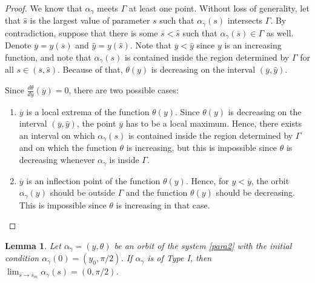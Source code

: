 \documentclass[12pt]{amsart}
\theoremstyle{plain}
\newtheorem{lemma}[theorem]{Lemma}
\theoremstyle{definition}
\begin{document}
\begin{proof}
    We know that $\alpha_\gamma$ meets $\Gamma$  at least one point. Without loss of generality, let   that $\hat{s}$ is the largest value of parameter $s$ such that $\alpha_\gamma(s)$ intersects $\Gamma$. By contradiction, suppose that there is some $\overline{s} < \hat{s}$ such that $\alpha_\gamma(\overline{s}) \in \Gamma$ as well. Denote $\overline{y} = y(\overline{s})$ and $\hat{y} = y(\hat{s})$. Note that $\overline{y} < \hat{y}$ since $y$ is an increasing function, and note that $\alpha_\gamma(s)$ is contained inside the region determined by $\Gamma$ for all $s \in (\overline{s}, \hat{s})$. Because of that, $\theta(y)$ is decreasing on the interval $(\overline{y}, \hat{y})$.

    Since $\frac{d\theta}{dy}(\overline{y}) = 0$, there are two possible cases:

    \begin{enumerate}
	\item  $\overline{y}$ is a local extrema of the function $\theta(y)$. Since $\theta(y)$ is decreasing on the interval $(\overline{y}, \hat{y})$, the point $\overline{y}$ has to be a local maximum. Hence, there exists an interval on which $\alpha_\gamma(s)$ is contained inside the region determined by $\Gamma$ and on which the function $\theta$ is increasing, but this is impossible since $\theta$ is decreasing whenever $\alpha_\gamma$ is inside $\Gamma$. 
	
	\item $\overline{y}$ is an inflection point of the function $\theta(y)$. Hence, for $y < \overline{y}$, the orbit $\alpha_\gamma(y)$ should be outside $\Gamma$ and the function $\theta(y)$ should be decreasing. This is impossible since $\theta$ is increasing in that case.   
    \end{enumerate}
\end{proof}

\begin{lemma}\label{le56}
    Let $\alpha_\gamma = (y, \theta)$ be an orbit of the system \eqref{para2} with the initial condition $\alpha_\gamma(0) = (y_0, \pi/2)$. If $\alpha_\gamma$ is of Type I, then $\lim_{s \to s_m} \alpha_\gamma(s) = (0, \pi/2)$.
\end{lemma}
\end{document}
